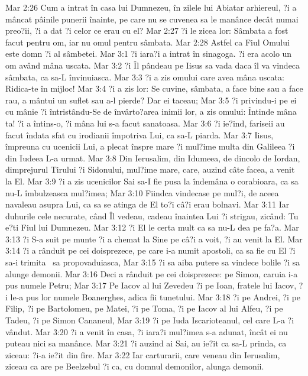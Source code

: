 Mar 2:26  Cum a intrat în casa lui Dumnezeu, în zilele lui Abiatar arhiereul, ?i a mâncat pâinile punerii înainte, pe care nu se cuvenea sa le manânce decât numai preo?ii, ?i a dat ?i celor ce erau cu el?
Mar 2:27  ?i le zicea lor: Sâmbata a fost facut pentru om, iar nu omul pentru sâmbata.
Mar 2:28  Astfel ca Fiul Omului este domn ?i al sâmbetei.
Mar 3:1  ?i iara?i a intrat în sinagoga. ?i era acolo un om având mâna uscata.
Mar 3:2  ?i Îl pândeau pe Iisus sa vada daca îl va vindeca sâmbata, ca sa-L învinuiasca.
Mar 3:3  ?i a zis omului care avea mâna uscata: Ridica-te în mijloc!
Mar 3:4  ?i a zis lor: Se cuvine, sâmbata, a face bine sau a face rau, a mântui un suflet sau a-l pierde? Dar ei taceau;
Mar 3:5  ?i privindu-i pe ei cu mânie ?i întristându-Se de învârto?area inimii lor, a zis omului: Întinde mâna ta! ?i a întins-o, ?i mâna lui s-a facut sanatoasa.
Mar 3:6  ?i ie?ind, fariseii au facut îndata sfat cu irodianii împotriva Lui, ca sa-L piarda.
Mar 3:7  Iisus, împreuna cu ucenicii Lui, a plecat înspre mare ?i mul?ime multa din Galileea ?i din Iudeea L-a urmat.
Mar 3:8  Din Ierusalim, din Idumeea, de dincolo de Iordan, dimprejurul Tirului ?i Sidonului, mul?ime mare, care, auzind câte facea, a venit la El.
Mar 3:9  ?i a zis ucenicilor Sai sa-I fie pusa la îndemâna o corabioara, ca sa nu-L îmbulzeasca mul?imea;
Mar 3:10  Fiindca vindecase pe mul?i, de aceea navaleau asupra Lui, ca sa se atinga de El to?i câ?i erau bolnavi.
Mar 3:11  Iar duhurile cele necurate, când Îl vedeau, cadeau înaintea Lui ?i strigau, zicând: Tu e?ti Fiul lui Dumnezeu.
Mar 3:12  ?i El le certa mult ca sa nu-L dea pe fa?a.
Mar 3:13  ?i S-a suit pe munte ?i a chemat la Sine pe câ?i a voit, ?i au venit la El.
Mar 3:14  ?i a rânduit pe cei doisprezece, pe care i-a numit apostoli, ca sa fie cu El ?i sa-i trimita  sa propovaduiasca,
Mar 3:15  ?i sa aiba putere sa vindece bolile ?i sa alunge demonii.
Mar 3:16  Deci a rânduit pe cei doisprezece: pe Simon, caruia i-a pus numele Petru;
Mar 3:17  Pe Iacov al lui Zevedeu ?i pe Ioan, fratele lui Iacov, ?i le-a pus lor numele Boanerghes, adica fii tunetului.
Mar 3:18  ?i pe Andrei, ?i pe Filip, ?i pe Bartolomeu, pe Matei, ?i pe Toma, ?i pe Iacov al lui Alfeu, ?i pe Tadeu, ?i pe Simon Cananeul,
Mar 3:19  ?i pe Iuda Iscarioteanul, cel care L-a ?i vândut.
Mar 3:20  ?i a venit în casa, ?i iara?i mul?imea s-a adunat, încât ei nu puteau nici sa manânce.
Mar 3:21  ?i auzind ai Sai, au ie?it ca sa-L prinda, ca ziceau: ?i-a ie?it din fire.
Mar 3:22  Iar carturarii, care veneau din Ierusalim, ziceau ca are pe Beelzebul ?i ca, cu domnul demonilor, alunga demonii.

